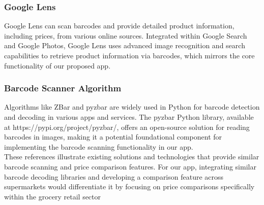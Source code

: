 \documentclass[conference]{IEEEtran}
\begin{document}
\subsubsection{Google Lens}
Google Lens can scan barcodes and provide detailed product information, including prices, from various online sources. Integrated within Google Search and Google Photos, Google Lens uses advanced image recognition and search capabilities to retrieve product information via barcodes, which mirrors the core functionality of our proposed app.

\subsubsection{Barcode Scanner Algorithm}
Algorithms like ZBar and pyzbar are widely used in Python for barcode detection and decoding in various apps and services. The pyzbar Python library, available at https://pypi.org/project/pyzbar/, offers an open-source solution for reading barcodes in images, making it a potential foundational component for implementing the barcode scanning functionality in our app.\\

These references illustrate existing solutions and technologies that provide similar barcode
scanning and price comparison features. For our app, integrating similar barcode decoding
libraries and developing a comparison feature across supermarkets would differentiate it by
focusing on price comparisons specifically within the grocery retail sector
\end{document}
